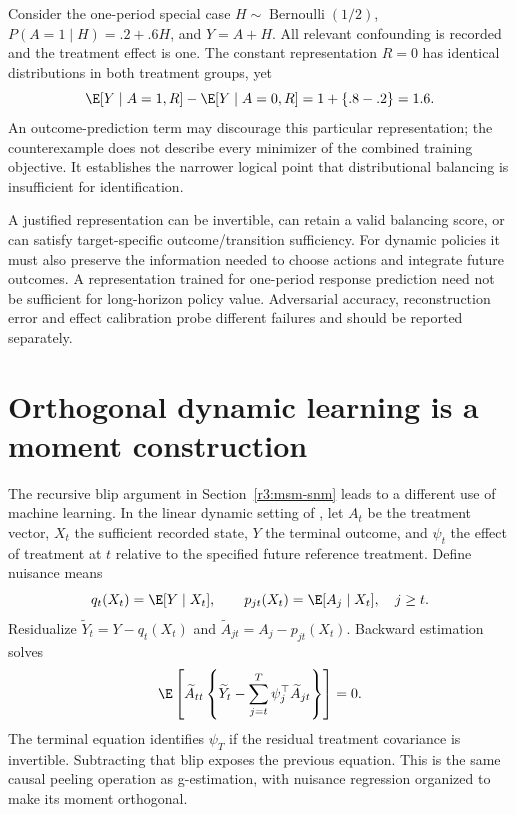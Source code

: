 Consider the one-period special case $H\sim\operatorname{Bernoulli}(1/2)$,
$P(A=1\mid H)=.2+.6H$, and $Y=A+H$. All relevant confounding is recorded
and the treatment effect is one. The constant representation $R=0$ has
identical distributions in both treatment groups, yet
\[
 \E[Y\mid A=1,R]-\E[Y\mid A=0,R]
 =1+\{.8-.2\}=1.6.
\]
An outcome-prediction term may discourage this particular representation;
the counterexample does not describe every minimizer of the combined
training objective. It establishes the narrower logical point that
distributional balancing is insufficient for identification.

A justified representation can be invertible, can retain a valid balancing
score, or can satisfy target-specific outcome/transition sufficiency. For
dynamic policies it must also preserve the information needed to choose
actions and integrate future outcomes. A representation trained for
one-period response prediction need not be sufficient for long-horizon
policy value. Adversarial accuracy, reconstruction error and effect
calibration probe different failures and should be reported separately.

\section{Orthogonal dynamic learning is a moment construction}
\label{r3:recent-dynamic-dml}

The recursive blip argument in Section~\ref{r3:msm-snm} leads to a different
use of machine learning. In the linear dynamic setting of
\citet[Section 2, Theorem 2 and Algorithm 1]{dynamicdml2021}, let $A_t$
be the treatment vector, $X_t$ the sufficient recorded state, $Y$ the
terminal outcome, and $\psi_t$ the effect of treatment at $t$ relative
to the specified future reference treatment. Define nuisance means
\[
 q_t(X_t)=\E[Y\mid X_t],\qquad
 p_{jt}(X_t)=\E[A_j\mid X_t],\quad j\geq t.
\]
Residualize $\widetilde Y_t=Y-q_t(X_t)$ and
$\widetilde A_{jt}=A_j-p_{jt}(X_t)$. Backward estimation solves
\begin{equation}
 \E\left[\widetilde A_{tt}
 \left\{\widetilde Y_t-\sum_{j=t}^T\psi_j^\top
                  \widetilde A_{jt}\right\}\right]=0.
 \label{r3:dynamic-orthogonal}
\end{equation}
The terminal equation identifies $\psi_T$ if the residual treatment
covariance is invertible. Subtracting that blip exposes the previous
equation. This is the same causal peeling operation as g-estimation,
with nuisance regression organized to make its moment orthogonal.

